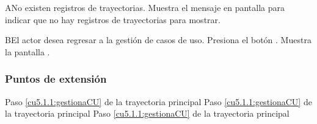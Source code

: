  \begin{UCtrayectoriaA}{A}{No existen registros de trayectorias.}
    \UCpaso[\UCsist] Muestra el mensaje  en pantalla  
    para indicar que no hay registros de trayectorias para mostrar.
 \end{UCtrayectoriaA}
 
 \begin{UCtrayectoriaA}{B}{El actor desea regresar a la gestión de casos de uso.}
    \UCpaso[\UCactor] Presiona el botón .
    \UCpaso[\UCsist] Muestra la pantalla .
 \end{UCtrayectoriaA}
 
\subsubsection{Puntos de extensión}

	{Paso \ref{cu5.1.1:gestionaCU} de la trayectoria principal}
	{}
	{Paso \ref{cu5.1.1:gestionaCU} de la trayectoria principal}
	{}
	{Paso \ref{cu5.1.1:gestionaCU} de la trayectoria principal}
	{}
  